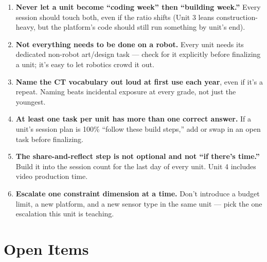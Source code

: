 \documentclass[10pt, a4paper]{article}
\begin{document}
\begin{enumerate}
\item \textbf{Never let a unit become ``coding week'' then ``building week.''} Every session should touch both, even if the ratio shifts (Unit 3 leans construction-heavy, but the platform's code should still run something by unit's end).
\item \textbf{Not everything needs to be done on a robot.} Every unit needs its dedicated non-robot art/design task --- check for it explicitly before finalizing a unit; it's easy to let robotics crowd it out.
\item \textbf{Name the CT vocabulary out loud at first use each year}, even if it's a repeat. Naming beats incidental exposure at every grade, not just the youngest.
\item \textbf{At least one task per unit has more than one correct answer.} If a unit's session plan is 100\% ``follow these build steps,'' add or swap in an open task before finalizing.
\item \textbf{The share-and-reflect step is not optional and not ``if there's time.''} Build it into the session count for the last day of every unit. Unit 4 includes video production time.
\item \textbf{Escalate one constraint dimension at a time.} Don't introduce a budget limit, a new platform, and a new sensor type in the same unit --- pick the one escalation this unit is teaching.
\end{enumerate}

\section{Open Items}
\end{document}
